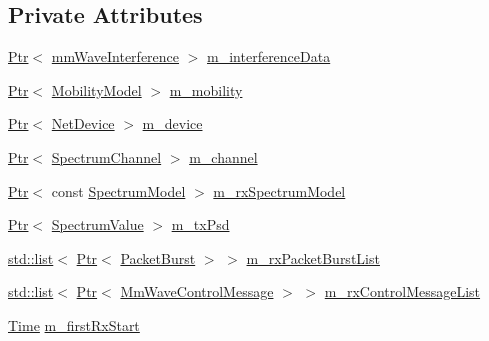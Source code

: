 \subsection*{Private Attributes}
\begin{DoxyCompactItemize}
\item 
\hyperlink{classns3_1_1Ptr}{Ptr}$<$ \hyperlink{classns3_1_1mmWaveInterference}{mm\+Wave\+Interference} $>$ \hyperlink{classns3_1_1MmWaveSpectrumPhy_a6fa712af38b75eaf093ca7feaaaa70fe}{m\+\_\+interference\+Data}
\item 
\hyperlink{classns3_1_1Ptr}{Ptr}$<$ \hyperlink{classns3_1_1MobilityModel}{Mobility\+Model} $>$ \hyperlink{classns3_1_1MmWaveSpectrumPhy_a8b1fcb8a45e1fcf1e7dfb863a781e648}{m\+\_\+mobility}
\item 
\hyperlink{classns3_1_1Ptr}{Ptr}$<$ \hyperlink{classns3_1_1NetDevice}{Net\+Device} $>$ \hyperlink{classns3_1_1MmWaveSpectrumPhy_a91844ba275c52192038a632a5923a34a}{m\+\_\+device}
\item 
\hyperlink{classns3_1_1Ptr}{Ptr}$<$ \hyperlink{classns3_1_1SpectrumChannel}{Spectrum\+Channel} $>$ \hyperlink{classns3_1_1MmWaveSpectrumPhy_ac22ba49144bce44918227ffe116a1d0b}{m\+\_\+channel}
\item 
\hyperlink{classns3_1_1Ptr}{Ptr}$<$ const \hyperlink{classns3_1_1SpectrumModel}{Spectrum\+Model} $>$ \hyperlink{classns3_1_1MmWaveSpectrumPhy_a3de2c464f107275e80a013deaa7d5ee5}{m\+\_\+rx\+Spectrum\+Model}
\item 
\hyperlink{classns3_1_1Ptr}{Ptr}$<$ \hyperlink{classns3_1_1SpectrumValue}{Spectrum\+Value} $>$ \hyperlink{classns3_1_1MmWaveSpectrumPhy_a74933903ca8be36fdb800f3232a0d10d}{m\+\_\+tx\+Psd}
\item 
\hyperlink{openflow-interface_8h_afd9bcfa176617760671b67580f536fa7}{std\+::list}$<$ \hyperlink{classns3_1_1Ptr}{Ptr}$<$ \hyperlink{classns3_1_1PacketBurst}{Packet\+Burst} $>$ $>$ \hyperlink{classns3_1_1MmWaveSpectrumPhy_ab57ce6deb73d1e7032276863528fa320}{m\+\_\+rx\+Packet\+Burst\+List}
\item 
\hyperlink{openflow-interface_8h_afd9bcfa176617760671b67580f536fa7}{std\+::list}$<$ \hyperlink{classns3_1_1Ptr}{Ptr}$<$ \hyperlink{classns3_1_1MmWaveControlMessage}{Mm\+Wave\+Control\+Message} $>$ $>$ \hyperlink{classns3_1_1MmWaveSpectrumPhy_a664d37bae64e42733ffbc3b225104ebd}{m\+\_\+rx\+Control\+Message\+List}
\item 
\hyperlink{classns3_1_1Time}{Time} \hyperlink{classns3_1_1MmWaveSpectrumPhy_adf29f10fcd3cc1c10aaec90bcdc80b14}{m\+\_\+first\+Rx\+Start}
\item 

\end{DoxyCompactItemize}
